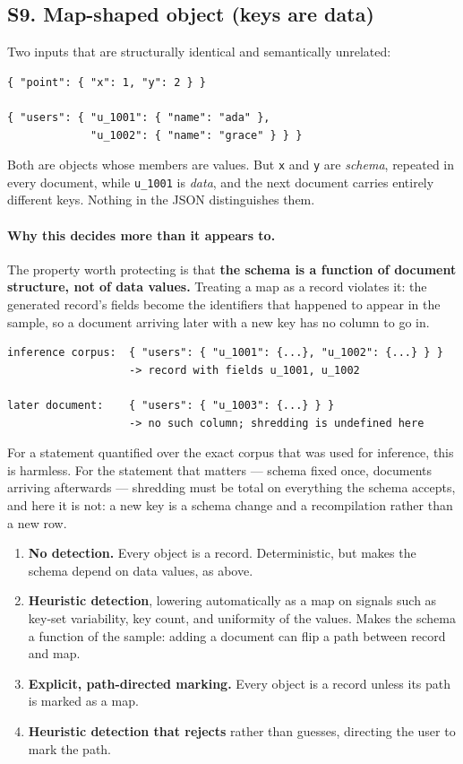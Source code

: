 \subsection*{S9. Map-shaped object (keys are data)}

Two inputs that are structurally identical and semantically unrelated:

\begin{lstlisting}[style=json]
{ "point": { "x": 1, "y": 2 } }

{ "users": { "u_1001": { "name": "ada" },
             "u_1002": { "name": "grace" } } }
\end{lstlisting}

Both are objects whose members are values. But \texttt{x} and \texttt{y} are
\emph{schema}, repeated in every document, while \texttt{u\_1001} is
\emph{data}, and the next document carries entirely different keys. Nothing in
the JSON distinguishes them.

\paragraph{Why this decides more than it appears to.}
The property worth protecting is that \textbf{the schema is a function of
document structure, not of data values.} Treating a map as a record violates
it: the generated record's fields become the identifiers that happened to
appear in the sample, so a document arriving later with a new key has no
column to go in.

\begin{lstlisting}[style=json]
inference corpus:  { "users": { "u_1001": {...}, "u_1002": {...} } }
                   -> record with fields u_1001, u_1002

later document:    { "users": { "u_1003": {...} } }
                   -> no such column; shredding is undefined here
\end{lstlisting}

For a statement quantified over the exact corpus that was used for inference,
this is harmless. For the statement that matters --- schema fixed once,
documents arriving afterwards --- shredding must be total on everything the
schema accepts, and here it is not: a new key is a schema change and a
recompilation rather than a new row.

\options
\begin{enumerate}[label=\textbf{(\alph*)}]
  \item \textbf{No detection.} Every object is a record. Deterministic, but
        makes the schema depend on data values, as above.
  \item \textbf{Heuristic detection}, lowering automatically as a map on
        signals such as key-set variability, key count, and uniformity of the
        values. Makes the schema a function of the sample: adding a document
        can flip a path between record and map.
  \item \textbf{Explicit, path-directed marking.} Every object is a record
        unless its path is marked as a map. \selected
  \item \textbf{Heuristic detection that rejects} rather than guesses,
        directing the user to mark the path.
\end{enumerate}

